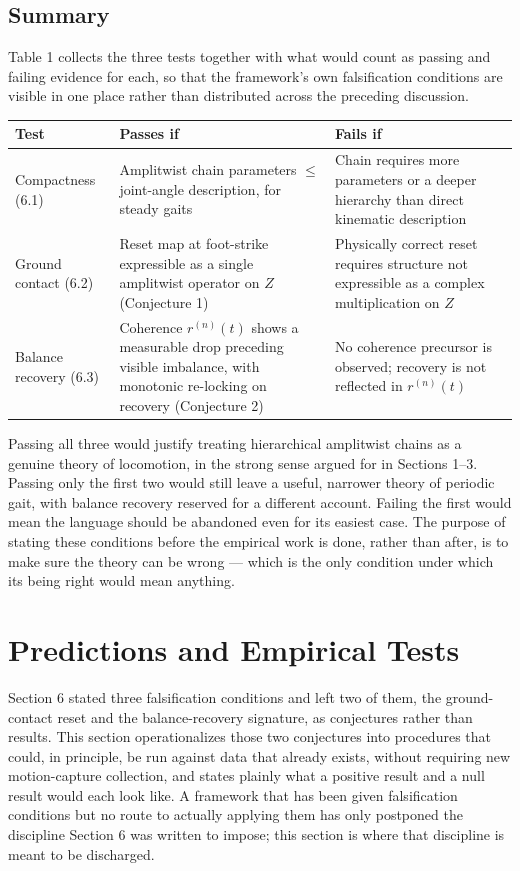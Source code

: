 \documentclass[12pt]{article}
\begin{document}
\subsection{Summary}

Table 1 collects the three tests together with what would count as passing and failing evidence for each, so that the framework's own falsification conditions are visible in one place rather than distributed across the preceding discussion.

\begin{center}
\begin{tabular}{p{3.2cm}p{4.6cm}p{4.6cm}}
\textbf{Test} & \textbf{Passes if} & \textbf{Fails if} \\
\hline
Compactness (6.1) & Amplitwist chain parameters $\le$ joint-angle description, for steady gaits & Chain requires more parameters or a deeper hierarchy than direct kinematic description \\
Ground contact (6.2) & Reset map at foot-strike expressible as a single amplitwist operator on $Z$ (Conjecture 1) & Physically correct reset requires structure not expressible as a complex multiplication on $Z$ \\
Balance recovery (6.3) & Coherence $r^{(n)}(t)$ shows a measurable drop preceding visible imbalance, with monotonic re-locking on recovery (Conjecture 2) & No coherence precursor is observed; recovery is not reflected in $r^{(n)}(t)$ \\
\end{tabular}
\end{center}

Passing all three would justify treating hierarchical amplitwist chains as a genuine theory of locomotion, in the strong sense argued for in Sections 1--3. Passing only the first two would still leave a useful, narrower theory of periodic gait, with balance recovery reserved for a different account. Failing the first would mean the language should be abandoned even for its easiest case. The purpose of stating these conditions before the empirical work is done, rather than after, is to make sure the theory can be wrong — which is the only condition under which its being right would mean anything.

\section{Predictions and Empirical Tests}

Section 6 stated three falsification conditions and left two of them, the ground-contact reset and the balance-recovery signature, as conjectures rather than results. This section operationalizes those two conjectures into procedures that could, in principle, be run against data that already exists, without requiring new motion-capture collection, and states plainly what a positive result and a null result would each look like. A framework that has been given falsification conditions but no route to actually applying them has only postponed the discipline Section 6 was written to impose; this section is where that discipline is meant to be discharged.
\end{document}
